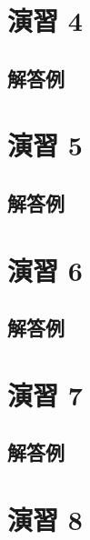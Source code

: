 \documentclass[
  12pt,
]{book}
\begin{document}
\hypertarget{ux6f14ux7fd2-4-2}{%
\section*{演習 4}\label{ux6f14ux7fd2-4-2}}

\hypertarget{ux89e3ux7b54ux4f8b-3}{%
\subsection*{解答例}\label{ux89e3ux7b54ux4f8b-3}}

\hypertarget{ux6f14ux7fd2-5-1}{%
\section*{演習 5}\label{ux6f14ux7fd2-5-1}}

\hypertarget{ux89e3ux7b54ux4f8b-4}{%
\subsection*{解答例}\label{ux89e3ux7b54ux4f8b-4}}

\hypertarget{ux6f14ux7fd2-6-1}{%
\section*{演習 6}\label{ux6f14ux7fd2-6-1}}

\hypertarget{ux89e3ux7b54ux4f8b-5}{%
\subsection*{解答例}\label{ux89e3ux7b54ux4f8b-5}}

\hypertarget{ux6f14ux7fd2-7-2}{%
\section*{演習 7}\label{ux6f14ux7fd2-7-2}}

\hypertarget{ux89e3ux7b54ux4f8b-6}{%
\subsection*{解答例}\label{ux89e3ux7b54ux4f8b-6}}

\hypertarget{ux6f14ux7fd2-8-1}{%
\section*{演習 8}\label{ux6f14ux7fd2-8-1}}
\end{document}
